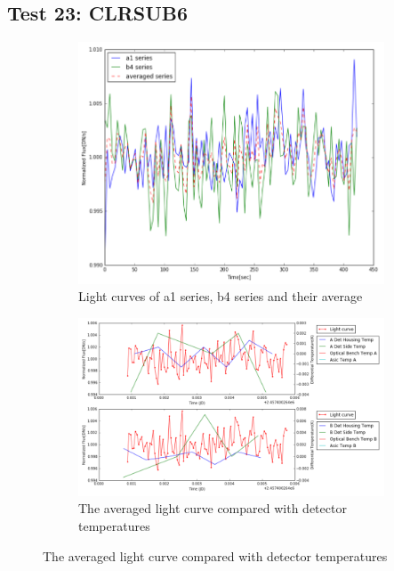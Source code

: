 \documentclass[conference]{IEEEtran}
\begin{document}
\subsection{Test 23: CLRSUB6} 
\begin{figure}[H]
    \centering
    \begin{subfigure}{1}
        \includegraphics[scale=0.4]{ts_test23}
        \caption{Light curves of a1 series, b4 series and their average}
    \end{subfigure}

    \begin{subfigure}{2}
        \includegraphics[scale=0.4]{temp_test23}
        \caption{The averaged light curve compared with detector temperatures}
    \end{subfigure}
   

\end{figure}
\end{document}
